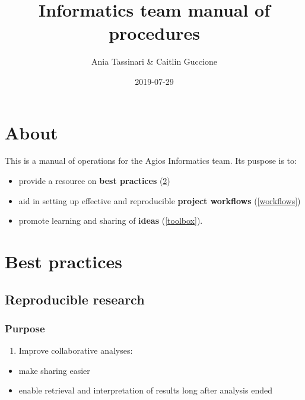 \documentclass[openany]{article}
\title{Informatics team manual of procedures}
\author{Ania Tassinari \& Caitlin Guccione}
\date{2019-07-29}
\providecommand{\tightlist}{%
  \setlength{\itemsep}{0pt}\setlength{\parskip}{0pt}}
\begin{document}
\maketitle

{
\hypersetup{linkcolor=black}
\setcounter{tocdepth}{2}
\tableofcontents
}
\hypertarget{about}{%
\section{About}\label{about}}

This is a manual of operations for the Agios Informatics team. Its puspose is to:

\begin{itemize}
\tightlist
\item
  provide a resource on \textbf{best practices} (\ref{bestpractices})
\item
  aid in setting up effective and reproducible \textbf{project workflows} (\ref{workflows})
\item
  promote learning and sharing of \textbf{ideas} (\ref{toolbox}).
\end{itemize}

\hypertarget{bestpractices}{%
\section{Best practices}\label{bestpractices}}

\hypertarget{reproducible-research}{%
\subsection{Reproducible research}\label{reproducible-research}}

\hypertarget{purpose}{%
\subsubsection{Purpose}\label{purpose}}

\begin{enumerate}
\def\labelenumi{\arabic{enumi}.}
\tightlist
\item
  Improve collaborative analyses:
\end{enumerate}

\begin{itemize}
\tightlist
\item
  make sharing easier
\item
  enable retrieval and interpretation of results long after analysis ended
\end{itemize}
\end{document}
